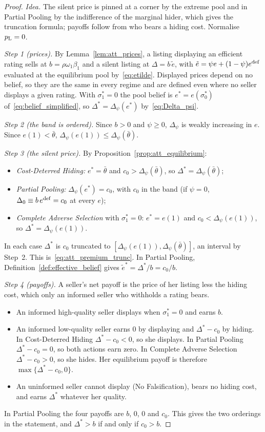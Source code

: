 \begin{proof}\upshape
\emph{Idea.} The silent price is pinned at a corner by the extreme pool and in Partial Pooling by the indifference of the marginal hider, which gives the truncation formula; payoffs follow from who bears a hiding cost. Normalise $p_{\rm L}=0$.

\emph{Step 1 (prices).} By Lemma~\ref{lem:att_prices}, a listing displaying an efficient rating sells at $b=\rho\omega_1\beta_1$ and a silent listing at $\Delta=b\,\tilde e$, with $\tilde e=\psi e+(1-\psi)e^{\rm def}$ evaluated at the equilibrium pool by~\eqref{eq:etilde}. Displayed prices depend on no belief, so they are the same in every regime and are defined even where no seller displays a given rating. With $\sigma_1^*=0$ the pool belief is $e^*=e(\sigma_0^*)$ of~\eqref{eq:belief_simplified}, so $\Delta^*=\Delta_\psi(e^*)$ by~\eqref{eq:Delta_psi}.

\emph{Step 2 (the band is ordered).} Since $b>0$ and $\psi\ge0$, $\Delta_\psi$ is weakly increasing in $e$. Since $e(1)<\bar\theta$, $\Delta_\psi(e(1))\le\Delta_\psi(\bar\theta)$.

\emph{Step 3 (the silent price).} By Proposition~\ref{prop:att_equilibrium}:
\begin{itemize}
    \item \emph{Cost-Deterred Hiding:} $e^*=\bar\theta$ and $c_0>\Delta_\psi(\bar\theta)$, so $\Delta^*=\Delta_\psi(\bar\theta)$;
    \item \emph{Partial Pooling:} $\Delta_\psi(e^*)=c_0$, with $c_0$ in the band (if $\psi=0$, $\Delta_0\equiv b\,e^{\rm def}=c_0$ at every $e$);
    \item \emph{Complete Adverse Selection} with $\sigma_1^*=0$: $e^*=e(1)$ and $c_0<\Delta_\psi(e(1))$, so $\Delta^*=\Delta_\psi(e(1))$.
\end{itemize}
In each case $\Delta^*$ is $c_0$ truncated to $[\Delta_\psi(e(1)),\Delta_\psi(\bar\theta)]$, an interval by Step~2. This is~\eqref{eq:att_premium_trunc}. In Partial Pooling, Definition~\ref{def:effective_belief} gives $\tilde e^*=\Delta^*/b=c_0/b$.

\emph{Step 4 (payoffs).} A seller's net payoff is the price of her listing less the hiding cost, which only an informed seller who withholds a rating bears.
\begin{itemize}
    \item An informed high-quality seller displays when $\sigma_1^*=0$ and earns $b$.
    \item An informed low-quality seller earns $0$ by displaying and $\Delta^*-c_0$ by hiding. In Cost-Deterred Hiding $\Delta^*-c_0<0$, so she displays. In Partial Pooling $\Delta^*-c_0=0$, so both actions earn zero. In Complete Adverse Selection $\Delta^*-c_0>0$, so she hides. Her equilibrium payoff is therefore $\max\{\Delta^*-c_0,0\}$.
    \item An uninformed seller cannot display (No Falsification), bears no hiding cost, and earns $\Delta^*$ whatever her quality.
\end{itemize}
In Partial Pooling the four payoffs are $b$, $0$, $0$ and $c_0$. This gives the two orderings in the statement, and $\Delta^*>b$ if and only if $c_0>b$.


\end{proof}

